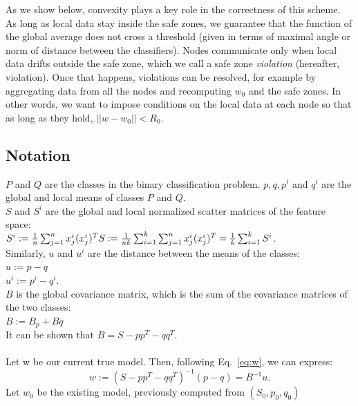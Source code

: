 \documentclass{sig-alternate-05-2015}
\begin{document}
\par As we show below, convexity
plays a key role in the correctness of this scheme. As long
as local data stay inside the safe zones, we guarantee that
the function of the global average does not cross a threshold (given
in terms of maximal angle or norm of distance between the classifiers).
Nodes communicate only when local data drifts outside the
safe zone, which we call a safe zone \textit{violation} (hereafter,
violation). Once that happens, violations can be resolved, 
for example by aggregating data from all the nodes and recomputing $w_0$ 
and the safe zones.
In other words, we want to impose conditions on the local
data at each node so that as long as they hold, $||w-w_0||<R_0$.

\subsection{Notation}
\noindent
$P$ and $Q$ are the classes in the binary classification problem.
 $p,q,p^i$ and $q^i$  are the global and local means of classes $P$ and $Q$.
\\$S$ and $S^i$  are the global and local normalized scatter matrices of the feature space:
\\$S^i := \frac{1}{n}\sum_{j=1}^{n}x^i_j(x^i_j)^T
\\S := \frac{1}{nk}
\sum_{i=1}^k\sum_{j=1}^nx^i_j(x^i_j)^T=\frac{1}{k}\sum_{i=1}^kS^i$.
\\Similarly, $u$ and $u^i$ are the distance between the means of the classes:
\\$u:=p - q$
\\$u^i:=p^i - q^i$.
\\ $B$ is the global covariance matrix, which is the sum of the covariance
matrices of the two classes:
\\$B:=B_p+Bq$
\\It can be shown that
$B=S - pp^T - qq^T$.
\\\\Let w be our current true model. Then, following Eq.~\ref{eq:w}, we can
express:
\begin{equation*}
w:=(S - pp^T - qq^T)^{-1}(p-q)=B^{-1}u.
\end{equation*}
Let $w_0$ be the existing model, previously computed from $(S_0, p_0, q_0)$
\end{document}
